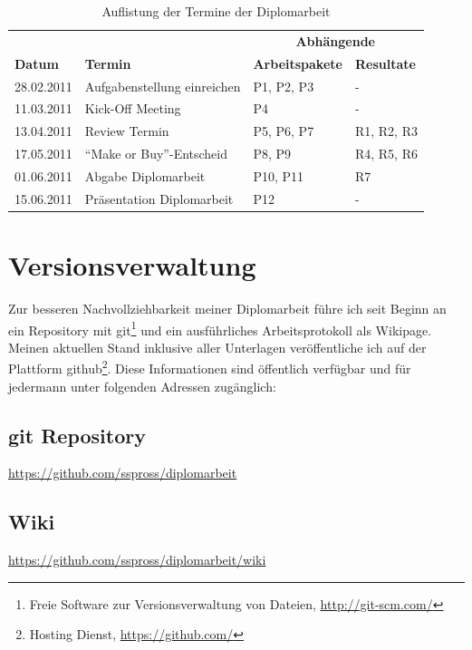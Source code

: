 \begin{table}[h]
\begin{center}
    \begin{tabular}{llll}
        \toprule & & \multicolumn{2}{c}{\textbf{Abhängende}} \\
        \textbf{Datum} & \textbf{Termin} & \textbf{Arbeitspakete} & \textbf{Resultate} \\
        \midrule 28.02.2011 & Aufgabenstellung einreichen & P1, P2, P3 & - \\
        \midrule 11.03.2011 & Kick-Off Meeting & P4 & -\\
        \midrule 13.04.2011 & Review Termin & P5, P6, P7 & R1, R2, R3 \\
        \midrule 17.05.2011 & ``Make or Buy''-Entscheid & P8, P9 & R4, R5, R6 \\
        \midrule 01.06.2011 & Abgabe Diplomarbeit & P10, P11 & R7 \\
        \midrule 15.06.2011 & Präsentation Diplomarbeit & P12 & - \\
        \bottomrule
    \end{tabular}
    \caption{Auflistung der Termine der Diplomarbeit}
    \label{tab:termine_diplomarbeit}
\end{center}
\end{table}

\section{Versionsverwaltung}
Zur besseren Nachvollziehbarkeit meiner Diplomarbeit führe ich seit Beginn an
ein Repository mit git\footnote{Freie Software zur Versionsverwaltung von Dateien,
\url{http://git-scm.com/}} und ein ausführliches Arbeitsprotokoll als Wikipage.
Meinen aktuellen Stand inklusive aller Unterlagen veröffentliche ich auf der 
Plattform github\footnote{Hosting Dienst, \url{https://github.com/}}. Diese 
Informationen sind öffentlich verfügbar und für jedermann unter folgenden 
Adressen zugänglich:

\subsection{git Repository}
\url{https://github.com/sspross/diplomarbeit}

\subsection{Wiki}
\url{https://github.com/sspross/diplomarbeit/wiki}

